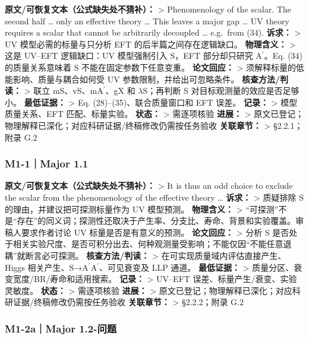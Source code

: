 \documentclass[
  chinese,
  UTF8]{ctexart}
\begin{document}
\textbf{原文/可恢复文本（公式缺失处不猜补）：} \textgreater{}
Phenomenology of the scalar. The second half \ldots{} only an effective
theory \ldots{} This leaves a major gap \ldots{} UV theory requires a
scalar that cannot be arbitrarily decoupled \ldots{} e.g.~from (34).
\textbf{诉求：} \textgreater{} UV 模型必需的标量与只分析 EFT
的后半篇之间存在逻辑缺口。 \textbf{物理含义：} \textgreater{} 这是
UV--EFT 逻辑缺口：UV 模型强制引入 S，EFT 部分却只研究
A\ensuremath{^\prime}。Eq. (34) 的质量关系意味着 S
不能在固定参数下任意变重。 \textbf{论文回应：} \textgreater{}
须解释标量的低能影响、质量与耦合如何受 UV 参数限制，并给出可忽略条件。
\textbf{核查方法/判读：} \textgreater{} 联立
mS、vS、mA\ensuremath{^\prime}、gX 和 \ensuremath{\lambda}S；再判断 S
对目标观测量的效应是否足够小。 \textbf{最低证据：} \textgreater{} Eq.
(28)--(35)、联合质量窗口和 EFT 误差。 \textbf{记录：} \textgreater{}
模型质量关系、EFT 匹配、标量实验。 \textbf{状态：} \textgreater{}
需逐项核验 \textbf{进展：} \textgreater{}
原文已登记；物理解释已深化；对应科研证据/终稿修改仍需按任务验收
\textbf{关联章节：} \textgreater{} §2.2.1；附录 G.2

\subsubsection{M1-1｜Major 1.1}\label{m1-1major-1.1}

\textbf{原文/可恢复文本（公式缺失处不猜补）：} \textgreater{} It is thus
an odd choice to exclude the scalar from the phenomenology of the
effective theory \ldots{} \textbf{诉求：} \textgreater{} 质疑排除 S
的理由，并建议把可探测标量作为 UV 模型预测。 \textbf{物理含义：}
\textgreater{}
``可探测''不是``存在''的同义词；探测性还取决于产生率、分支比、寿命、背景和实验覆盖。审稿人要求作者讨论
UV 标量是否是有意义的预测。 \textbf{论文回应：} \textgreater{} 分析 S
是否处于相关实验尺度、是否可积分出去、何种观测量受影响；不能仅因``不能任意退耦''就断言必可探测。
\textbf{核查方法/判读：} \textgreater{}
在可实现质量域内评估直接产生、Higgs
相关产生、S→A\ensuremath{^\prime}A\ensuremath{^\prime}、可见衰变及 LLP
通道。 \textbf{最低证据：} \textgreater{}
质量分区、衰变宽度/BR/寿命和适用搜索。 \textbf{记录：} \textgreater{}
UV--EFT 误差、标量产生/衰变、实验灵敏度。 \textbf{状态：} \textgreater{}
需逐项核验 \textbf{进展：} \textgreater{}
原文已登记；物理解释已深化；对应科研证据/终稿修改仍需按任务验收
\textbf{关联章节：} \textgreater{} §2.2.2；附录 G.2

\subsubsection{M1-2a｜Major 1.2-问题}\label{m1-2amajor-1.2-ux95eeux9898}
\end{document}
